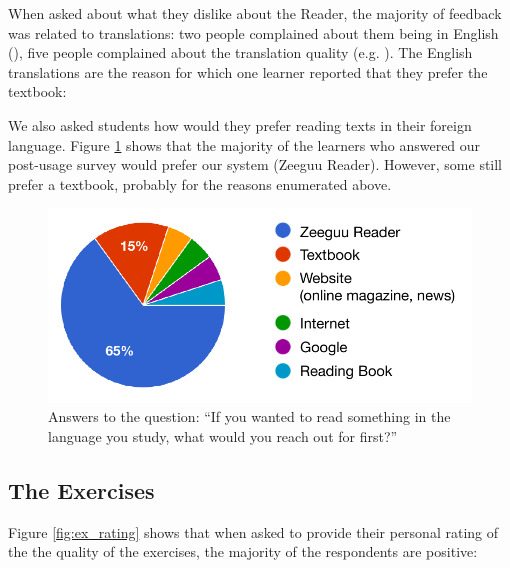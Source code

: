 
When asked about what they dislike about the Reader, the majority of feedback was related to translations: two people complained about them being in English (), five people complained about the translation quality (e.g. ). The English translations are the reason for which one learner reported that they prefer the textbook: 


We also asked students how would they prefer reading texts in their foreign language.
 Figure \ref{fig:preferred_reader} shows that the majority of the learners who answered our post-usage survey would prefer our system (Zeeguu Reader). However, some still prefer a textbook, probably for the reasons enumerated above.

 \begin{figure}[h!]
    \centering
      \includegraphics[width=0.8\columnwidth]{figures/opinions/reader_vs_textbook}
      \caption{Answers to the question: {``If you wanted to read something in the language you study, what would you reach out for first?''}}
      \label{fig:preferred_reader}
    \end{figure}



\subsection{The Exercises}
Figure \ref{fig:ex_rating} shows that when asked to provide their personal rating of the the quality of the exercises, the majority of the respondents are positive: 

